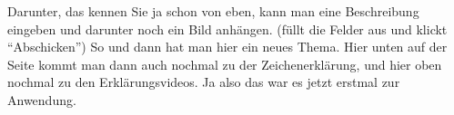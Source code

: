 \begin{itemize}
Darunter, das kennen Sie ja schon von eben, kann man eine Beschreibung eingeben und darunter noch ein Bild anh{\"a}ngen. (f{\"u}llt die Felder aus und klickt "`Abschicken"') So und dann hat man hier ein neues Thema. Hier unten auf der Seite kommt man dann auch nochmal zu der Zeichenerkl{\"a}rung, und hier oben nochmal zu den Erkl{\"a}rungsvideos. Ja also das war es jetzt erstmal zur Anwendung.
\end{itemize}